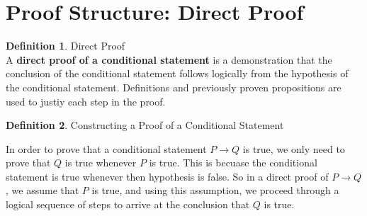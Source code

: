 \documentclass{book}
\theoremstyle{definition}
\newtheorem{definition}{Definition}[section]
\theoremstyle{remark}
\begin{document}
\newpage
\section{Proof Structure: Direct Proof}
\begin{definition}
Direct Proof \\

A {\bf direct proof of a conditional statement} is a demonstration that the conclusion of the conditional statement follows logically from the hypothesis of the conditional statement. Definitions and previously proven propositions are used to justiy each step in the proof. \\
\end{definition}

\begin{definition}
Constructing a Proof of a Conditional Statement

In order to prove that a conditional statement $P \to Q$ is true, we only need to prove that $Q$ is true whenever $P$ is true. This is becuase the conditional statement is true whenever then hypothesis is false. So in a direct proof of $P \to Q$, we assume that $P$ is true, and using this assumption, we proceed through a logical sequence of steps to arrive at the conclusion that $Q$ is true. \\
\end{definition}
\end{document}

